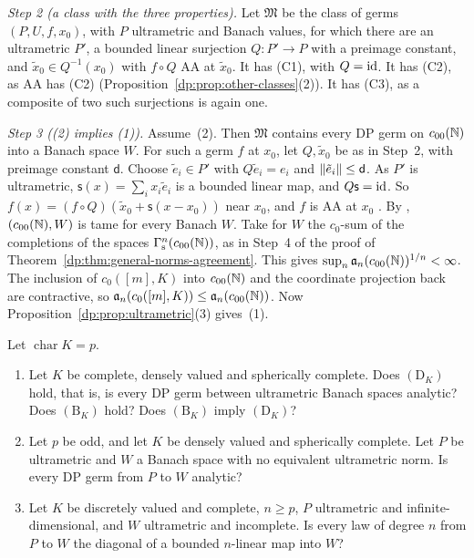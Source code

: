 \emph{Step 2 (a class with the three properties).} Let $\mathfrak M$ be the class of germs $(P,U,f,x_0)$, with $P$ ultrametric and Banach values, for which there are an ultrametric $P'$, a bounded linear surjection $Q\colon P'\to P$ with a preimage constant, and $\tilde x_0\in Q^{-1}(x_0)$ with $f\circ Q$ AA at $\tilde x_0$. It has (C1), with $Q=\mathrm{id}$. It has (C2), as AA has (C2) (Proposition~\ref{dp:prop:other-classes}(2)). It has (C3), as a composite of two such surjections is again one.

\emph{Step 3 ((2) implies (1)).} Assume~(2). Then $\mathfrak M$ contains every DP germ on $c_{00}(\mathbb N)$ into a Banach space $W$. For such a germ $f$ at $x_0$, let $Q,\tilde x_0$ be as in Step~2, with preimage constant $\mathsf d$. Choose $\tilde e_i\in P'$ with $Q\tilde e_i=e_i$ and $\lVert \tilde e_i\rVert\le\mathsf d$. As $P'$ is ultrametric, $\mathsf s(x)=\sum_ix_i\tilde e_i$ is a bounded linear map, and $Q\mathsf s=\mathrm{id}$. So $f(x)=(f\circ Q)(\tilde x_0+\mathsf s(x-x_0))$ near $x_0$, and $f$ is AA at $x_0$ \cite[Proposition~14.12(1)(b)]{I}. By \cite[Proposition~14.37]{I}, $(c_{00}(\mathbb N),W)$ is tame for every Banach $W$. Take for $W$ the $c_0$-sum of the completions of the spaces $\Gamma^n_{\mathrm s}(c_{00}(\mathbb N))$, as in Step~4 of the proof of Theorem~\ref{dp:thm:general-norms-agreement}. This gives $\sup_n\mathfrak a_n(c_{00}(\mathbb N))^{1/n}<\infty$. The inclusion of $c_0([m],K)$ into $c_{00}(\mathbb N)$ and the coordinate projection back are contractive, so $\mathfrak a_n(c_0([m],K))\le\mathfrak a_n(c_{00}(\mathbb N))$. Now Proposition~\ref{dp:prop:ultrametric}(3) gives~(1).

\begin{question}\label{dp:q:residual}
Let $\operatorname{char}K=p$.
\begin{enumerate}
\item Let $K$ be complete, densely valued and spherically complete. Does $(\mathrm D_K)$ hold, that is, is every DP germ between ultrametric Banach spaces analytic? Does $(\mathrm B_K)$ hold? Does $(\mathrm B_K)$ imply $(\mathrm D_K)$?
\item Let $p$ be odd, and let $K$ be densely valued and spherically complete. Let $P$ be ultrametric and $W$ a Banach space with no equivalent ultrametric norm. Is every DP germ from $P$ to $W$ analytic?
\item Let $K$ be discretely valued and complete, $n\ge p$, $P$ ultrametric and infinite-dimensional, and $W$ ultrametric and incomplete. Is every law of degree $n$ from $P$ to $W$ the diagonal of a bounded $n$\nobreakdash-linear map into $W$?
\end{enumerate}
\end{question}

